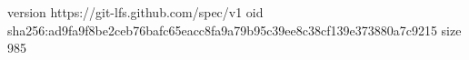 version https://git-lfs.github.com/spec/v1
oid sha256:ad9fa9f8be2ceb76bafc65eacc8fa9a79b95c39ee8c38cf139e373880a7c9215
size 985
